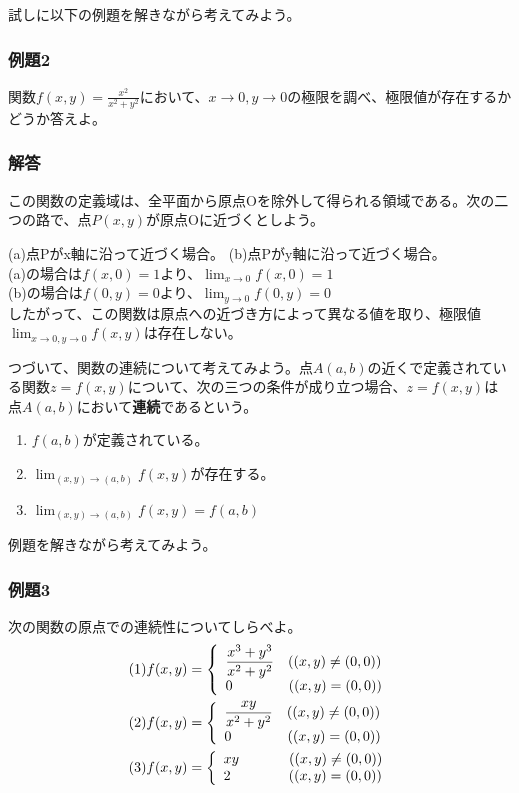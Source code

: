 \documentclass[a4j,dvipdfmx]{jsarticle}
\begin{document}
試しに以下の例題を解きながら考えてみよう。
\subsubsection*{例題2}
関数$\displaystyle f(x,y)=\frac{x^2}{x^2+y^2}$において、$x\to 0,y\to 0$の極限を調べ、極限値が存在するかどうか答えよ。


\subsubsection*{解答}
この関数の定義域は、全平面から原点Oを除外して得られる領域である。次の二つの路で、点$P(x,y)$が原点Oに近づくとしよう。

(a)点Pがx軸に沿って近づく場合。
(b)点Pがy軸に沿って近づく場合。\\
(a)の場合は$f(x,0)=1$より、$\displaystyle \lim_{x\to 0}f(x,0)=1$\\
(b)の場合は$f(0,y)=0$より、$\displaystyle \lim_{y\to 0}f(0,y)=0$\\
したがって、この関数は原点への近づき方によって異なる値を取り、極限値$\displaystyle\lim_{x\to 0,y\to 0}f(x,y)$は存在しない。


つづいて、関数の連続について考えてみよう。点$A(a,b)$の近くで定義されている関数$z=f(x,y)$について、次の三つの条件が成り立つ場合、$z=f(x,y)$は点$A(a,b)$において\textbf{連続}であるという。
\begin{enumerate}
    \item $f(a,b)$が定義されている。
    \item $\displaystyle\lim_{(x,y)\to(a,b)}f(x,y)$が存在する。
    \item $\displaystyle\lim_{(x,y)\to(a,b)}f(x,y)=f(a,b)$
\end{enumerate}
例題を解きながら考えてみよう。
\subsubsection*{例題3}
次の関数の原点での連続性についてしらべよ。
\begin{align*}
    &(1)f(x,y)= \left \{
        \begin{array}{l}
        \displaystyle\frac{x^3+y^3}{x^2+y^2} \quad((x,y)\neq(0,0))\\
        0 \qquad\qquad((x,y)=(0,0))
        \end{array}
        \right.\\
    &(2)f(x,y)= \left \{
        \begin{array}{l}
        \displaystyle\frac{xy}{x^2+y^2} \quad((x,y)\neq(0,0))\\
        0 \qquad\qquad((x,y)=(0,0))
        \end{array}
        \right.\\
    &(3)f(x,y)= \left \{
        \begin{array}{l}
        xy \hspace{2mm}\quad\qquad((x,y)\neq(0,0))\\
        2  \hspace{2mm}\quad\qquad\hspace{2mm}((x,y)=(0,0))
        \end{array}
        \right.
\end{align*}
\end{document}
